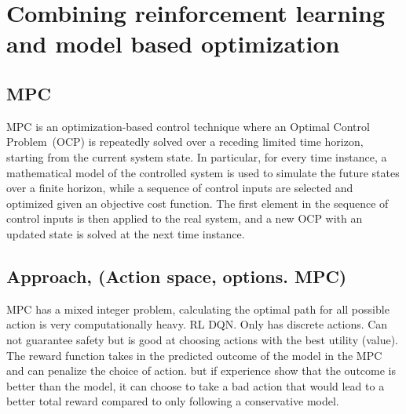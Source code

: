 \newcommand {\matr}[2]{\left[\begin{array}{#1}#2\end{array}\right]}
\newcommand{\E}{\mathbb{E}}
\newcommand{\tr}{\mathrm{tr}}
\newcommand{\x}{{\mathbf{x}}}
\renewcommand{\u}{{\mathbf{u}}}
\newcommand{\w}{{\mathbf{w}}}
\renewcommand{\r}{{\mathbf{r}}}


\chapter{Combining reinforcement learning and model based optimization}
\section{MPC}
MPC is an optimization-based control technique where an Optimal Control Problem~(OCP) is repeatedly solved over a receding limited time horizon, starting from the current system state. In particular, for every time instance, a mathematical model of the controlled system is used to simulate the future states over a finite horizon, while a sequence of control inputs are selected and optimized given an objective cost function. The first element in the sequence of control inputs is then applied to the real system, and a new OCP with an updated state is solved at the next time instance.

\section{Approach, (Action space, options. MPC)}
MPC has a mixed integer problem, calculating the optimal path for all possible action is very computationally heavy. 
RL DQN. Only has discrete actions. Can not guarantee safety but is good at choosing actions with the best utility (value). 
The reward function takes in the predicted outcome of the model in the MPC and can penalize the choice of action. but if experience show that the outcome is better than the model, it can choose to take a bad action that would lead to a better total reward compared to only following a conservative model. 

